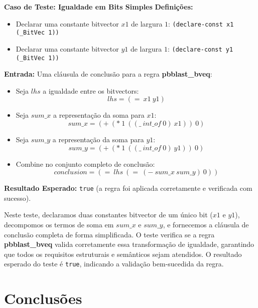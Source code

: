 \documentclass[conference]{IEEEtran}
\begin{document}
\begin{algorithmic}[1]
    \Statex \textbf{Caso de Teste: Igualdade em Bits Simples}
    \State \textbf{Definições:}
    \begin{itemize}
        \item Declarar uma constante bitvector $x1$ de largura $1$: \texttt{(declare-const x1 (\_BitVec 1))}
        \item Declarar uma constante bitvector $y1$ de largura $1$: \texttt{(declare-const y1 (\_BitVec 1))}
    \end{itemize}
    \State \textbf{Entrada:} Uma cláusula de conclusão para a regra \textbf{pbblast\_bveq}:
    \begin{itemize}
        \item Seja $lhs$ a igualdade entre os bitvectors:
              \[
                  lhs = (=\ x1\ y1)
              \]
        \item Seja $sum\_x$ a representação da soma para $x1$:
              \[
                  sum\_x = (+\ (*\ 1\ ((\_\ int\_of\ 0)\ x1))\ 0)
              \]
        \item Seja $sum\_y$ a representação da soma para $y1$:
              \[
                  sum\_y = (+\ (*\ 1\ ((\_\ int\_of\ 0)\ y1))\ 0)
              \]
        \item Combine no conjunto completo de conclusão:
              \[
                  conclusion = (=\ lhs\ (=\ (-\ sum\_x\ sum\_y)\ 0))
              \]
    \end{itemize}
    \State \textbf{Resultado Esperado:} \texttt{true} (a regra foi aplicada corretamente e verificada com sucesso).
    \EndProcedure

    \Statex
    \Statex Neste teste, declaramos duas constantes bitvector de um único bit ($x1$ e $y1$), decompomos os termos de soma em $sum\_x$ e $sum\_y$, e fornecemos a cláusula de conclusão completa de forma simplificada. O teste verifica se a regra \textbf{pbblast\_bveq} valida corretamente essa transformação de igualdade, garantindo que todos os requisitos estruturais e semânticos sejam atendidos. O resultado esperado do teste é \texttt{true}, indicando a validação bem-sucedida da regra.
\end{algorithmic}

\section*{Conclusões}
\end{document}
